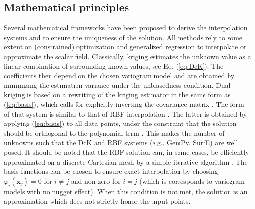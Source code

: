 \documentclass[preprint]{ring20}
\newcommand{\bx}{\mathbf{x}}
\begin{document}
\subsection{Mathematical principles} 

Several mathematical frameworks have been proposed to derive the interpolation systems and to ensure the uniqueness of the solution. 
All methods rely to some extent on (constrained) optimization and generalized regression to interpolate or approximate the scalar field. Classically, kriging estimates the unknown value as a linear combination of surrounding known values, see Eq. (\ref{eq:DcK}). The coefficients then depend on the chosen variogram model and are obtained by minimizing the estimation variance under the unbiasedness condition. Dual kriging is based on a rewriting of the kriging estimator in the same form as (\ref{eq:basis}), which calls for explicitly inverting the covariance matrix \citep{Lajaunie1997MG,Chiles04OMSMP}. The form of that system is similar to that of RBF interpolation \citep{Dubrule1984CG,Hillier2014MG}. The latter is obtained by applying (\ref{eq:basis}) to all data points, under the constraint that the solution should be orthogonal to the polynomial term \citep{Carr2001,Hillier2014MG}. This makes the number of unknowns such that the DcK and RBF systems (e.g., GemPy, SurfE) are well posed. It should be noted that the RBF solution can, in some cases, be efficiently approximated on a discrete Cartesian mesh by a simple iterative algorithm \citep{Park2006ITVCG}. The basis functions can be chosen to ensure exact interpolation by choosing $\varphi_i(\bx_j)=0$ for $i \neq j$ and non zero for $i = j$ (which is corresponds to variogram models with no nugget effect). When this condition is not met, the solution is an approximation which does not strictly honor the input points. 
\end{document}
